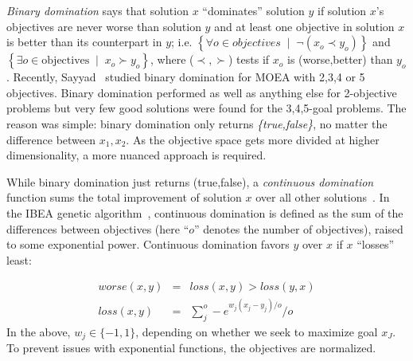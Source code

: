 \documentclass[10pt,journal,compsoc]{IEEEtran}
\begin{document}
{\em Binary domination} says that solution $x$ ``dominates''
solution $y$ if solution $x$'s objectives are never worse than  solution $y$
and at least one objective in solution $x$ is better than its counterpart in $y$; i.e.
 $\left\{ \forall o  \in \textit{objectives}\;\mid\; \neg ( x_o \prec y_o )\right\}$
and
 $\left\{
\exists o \in \text{objectives} \;\mid\; x_o \succ y_o\right\}$, where ($\prec,\succ$) tests if $x_o$ is (worse,better) than $y_o$.
 Recently, Sayyad~\cite{sayyad13a} studied binary domination for MOEA
with 2,3,4 or 5 objectives.  Binary domination performed as well as anything else
for 2-objective problems but very few good solutions were found for
the 3,4,5-goal problems.  The reason was simple: binary domination  only returns
{\em \{true,false\}}, no matter the difference between $x_1,x_2$. As the objective
space gets more divided at higher dimensionality, a more nuanced approach is required.


While binary domination just returns (true,false), a {\em continuous domination} function sums
the total improvement of solution $x$ over all other solutions~\cite{Zitzler04indicator-basedselection}.
In the IBEA genetic algorithm~\cite{Zitzler04indicator-basedselection}, continuous domination is defined as the sum of the
differences between objectives (here ``$o$'' denotes the number of objectives),
raised to some exponential power.
Continuous domination favors $y$ over $x$ if $x$ ``losses'' least:

\begin{equation}\label{eq:cdom}
\begin{array}{rcl}
\textit{worse}(x,y)& =& \textit{loss}(x,y) > \textit{loss}(y,x)\\
\textit{loss}(x,y)& = &\sum_j^o -e^{w_j(x_j - y_j)/o	} / o
\end{array}
\end{equation}
In the above, $w_j\in \{-1,1\}$, depending on whether
we seek to maximize goal $x_J$.   
To prevent issues with exponential functions,
the objectives are normalized.

\end{document}

